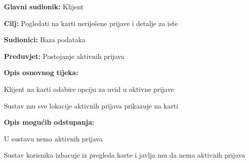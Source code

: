 					\noindent {}
					\begin{packed_item}
	
						\item \textbf{Glavni sudionik: }Klijent
						\item  \textbf{Cilj:} Pogledati na karti neriješene prijave i detalje za iste
						\item  \textbf{Sudionici:} Baza podataka
						\item  \textbf{Preduvjet:} Postojanje aktivnih prijava
						\item  \textbf{Opis osnovnog tijeka:}
						
						\item[] \begin{packed_enum}
	
							\item Klijent na karti odabire opciju za uvid u aktivne prijave 
							\item Sustav mu sve lokacije aktivnih prijava prikazuje na karti
						\end{packed_enum}
						
						\item  \textbf{Opis mogućih odstupanja:}
						
						\item[] \begin{packed_item}
	
							\item[1.a] U sustavu nema aktivnih prijava
							\item[] \begin{packed_enum}
								
								\item Sustav korisnika izbacuje iz pregleda karte i javlja mu da nema aktivnih prijava	
							\end{packed_enum}
							
						\end{packed_item}
					\end{packed_item}
					
